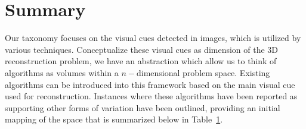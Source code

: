 \section{Summary}
Our taxonomy focuses on the visual cues detected in images, which is utilized by various techniques. Conceptualize these visual cues as dimension of the 3D reconstruction problem, we have an abstraction which allow us to think of algorithms as volumes within a $n-$dimensional problem space. Existing algorithms can be introduced into this framework based on the main visual cue used for reconstruction. Instances where these algorithms have been reported as supporting other forms of variation have been outlined, providing an initial mapping of the space that is summarized below in Table~\ref{}.

